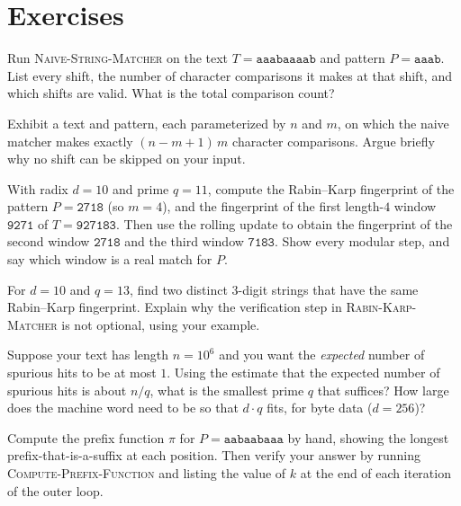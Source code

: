 \section{Exercises}
\label{ch31:exercises}

\begin{exercise}
Run \textsc{Naive-String-Matcher} on the text $T=\texttt{aaabaaaab}$ and pattern
$P=\texttt{aaab}$. List every shift, the number of character comparisons it
makes at that shift, and which shifts are valid. What is the total comparison
count?
\end{exercise}

\begin{exercise}
Exhibit a text and pattern, each parameterized by $n$ and $m$, on which the naive
matcher makes exactly $(n-m+1)\,m$ character comparisons. Argue briefly why no
shift can be skipped on your input.
\end{exercise}

\begin{exercise}
With radix $d=10$ and prime $q=11$, compute the Rabin--Karp fingerprint of the
pattern $P=\texttt{2718}$ (so $m=4$), and the fingerprint of the first
length-$4$ window $\texttt{9271}$ of $T=\texttt{927183}$. Then use the rolling
update to obtain the fingerprint of the second window $\texttt{2718}$ and the
third window $\texttt{7183}$. Show every modular step, and say which window is a
real match for $P$.
\end{exercise}

\begin{exercise}
For $d=10$ and $q=13$, find two distinct $3$-digit strings that have the same
Rabin--Karp fingerprint. Explain why the verification step in
\textsc{Rabin-Karp-Matcher} is not optional, using your example.
\end{exercise}

\begin{exercise}
Suppose your text has length $n=10^6$ and you want the \emph{expected} number of
spurious hits to be at most $1$. Using the estimate that the expected number of
spurious hits is about $n/q$, what is the smallest prime $q$ that suffices? How
large does the machine word need to be so that $d\cdot q$ fits, for byte data
($d=256$)?
\end{exercise}

\begin{exercise}
Compute the prefix function $\pi$ for $P=\texttt{aabaabaaa}$ by hand, showing the
longest prefix-that-is-a-suffix at each position. Then verify your answer by
running \textsc{Compute-Prefix-Function} and listing the value of $k$ at the end
of each iteration of the outer loop.
\end{exercise}

